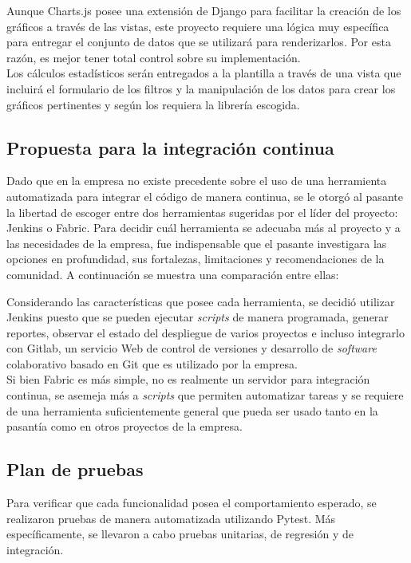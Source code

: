 Aunque Charts.js posee una extensión de Django para facilitar la creación de los gráficos a través de las vistas, este proyecto requiere una lógica muy específica para entregar el conjunto de datos que se utilizará para renderizarlos. Por esta razón, es mejor tener total control sobre su implementación. \\

Los cálculos estadísticos serán entregados a la plantilla a través de una vista que incluirá el formulario de los filtros y la manipulación de los datos para crear los gráficos pertinentes y según los requiera la librería escogida.

\subsection{Propuesta para la integración continua}

Dado que en la empresa no existe precedente sobre el uso de una herramienta automatizada para integrar el código de manera continua, se le otorgó al pasante la libertad de escoger entre dos herramientas sugeridas por el líder del proyecto: Jenkins o Fabric. Para decidir cuál herramienta se adecuaba más al proyecto y a las necesidades de la empresa, fue indispensable que el pasante investigara las opciones en profundidad, sus fortalezas, limitaciones y recomendaciones de la comunidad. A continuación se muestra una comparación entre ellas:


Considerando las características que posee cada herramienta, se decidió utilizar Jenkins puesto que se pueden ejecutar \textit{scripts} de manera programada, generar reportes, observar el estado del despliegue de varios proyectos e incluso integrarlo con Gitlab, un servicio Web de control de versiones y desarrollo de \textit{software} colaborativo basado en Git que es utilizado por la empresa. \\

Si bien Fabric es más simple, no es realmente un servidor para integración continua, se asemeja más a \textit{scripts} que permiten automatizar tareas y se requiere de una herramienta suficientemente general que pueda ser usado tanto en la pasantía como en otros proyectos de la empresa.

\subsection{Plan de pruebas}

Para verificar que cada funcionalidad posea el comportamiento esperado, se realizaron pruebas de manera automatizada utilizando Pytest. Más específicamente, se llevaron a cabo pruebas unitarias, de regresión y de integración.

